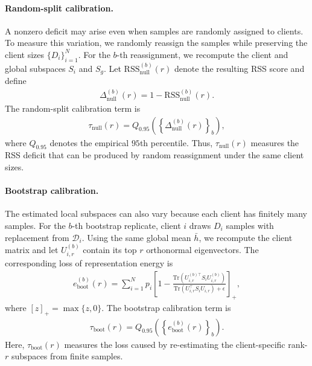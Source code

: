 \documentclass[lettersize,journal]{IEEEtran}
\begin{document}
	\paragraph{Random-split calibration.}
	A nonzero deficit may arise even when samples are randomly assigned to clients. To measure this variation, we randomly reassign the samples while preserving the client sizes $\{D_i\}_{i=1}^{N}$. For the $b$-th reassignment, we recompute the client and global subspaces $S_i$ and $S_g$. Let $\mathrm{RSS}_{\mathrm{null}}^{(b)}(r)$ denote the resulting RSS score and define
	\begin{align}
		\Delta_{\mathrm{null}}^{(b)}(r)
		=
		1-\mathrm{RSS}_{\mathrm{null}}^{(b)}(r).
	\end{align}
	The random-split calibration term is
	\begin{align}
		\tau_{\mathrm{null}}(r)
		=
		Q_{0.95}
		\left(
		\left\{
		\Delta_{\mathrm{null}}^{(b)}(r)
		\right\}_{b}
		\right),
		\label{eq:sass_null_threshold}
	\end{align}
	where $Q_{0.95}$ denotes the empirical $95$th percentile. Thus, $\tau_{\mathrm{null}}(r)$ measures the RSS deficit that can be produced by random reassignment under the same client sizes.
	
	\paragraph{Bootstrap calibration.}
	The estimated local subspaces can also vary because each client has finitely many samples. For the $b$-th bootstrap replicate, client $i$ draws $D_i$ samples with replacement from $\mathcal{D}_i$. Using the same global mean $\bar{h}$, we recompute the client matrix and let $U_{i,r}^{(b)}$ contain its top $r$ orthonormal eigenvectors. The corresponding loss of representation energy is
	\begin{align}
		e_{\mathrm{boot}}^{(b)}(r)
		=
		\sum_{i=1}^{N}
		p_i
		\left[
		1-
		\frac{
			\mathrm{Tr}
			\left(
			U_{i,r}^{(b)\top}S_iU_{i,r}^{(b)}
			\right)
		}{
			\mathrm{Tr}
			\left(
			U_{i,r}^{\top}S_iU_{i,r}
			\right)
			+
			\epsilon
		}
		\right]_{+},
		\label{eq:sass_boot_error}
	\end{align}
	where $[z]_{+}=\max\{z,0\}$. The bootstrap calibration term is
	\begin{align}
		\tau_{\mathrm{boot}}(r)
		=
		Q_{0.95}
		\left(
		\left\{
		e_{\mathrm{boot}}^{(b)}(r)
		\right\}_{b}
		\right).
		\label{eq:sass_boot_threshold}
	\end{align}
	Here, $\tau_{\mathrm{boot}}(r)$ measures the loss caused by re-estimating the client-specific rank-$r$ subspaces from finite samples.
	
\end{document}

